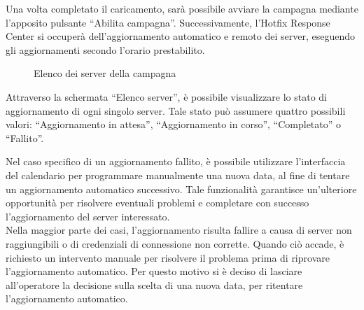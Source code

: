 Una volta completato il caricamento, sarà possibile avviare la campagna mediante 
l'apposito pulsante “Abilita campagna”. Successivamente, l'Hotfix Response Center 
si occuperà dell'aggiornamento automatico e remoto dei server, eseguendo gli 
aggiornamenti secondo l'orario prestabilito.

\begin{figure}[H]
\begin{flushright}
    \centering
    \caption{Elenco dei server della campagna}
    \label{fig:Elenco dei server della campagna}
\end{flushright}
\end{figure}

Attraverso la schermata “Elenco server”, è possibile visualizzare lo stato di 
aggiornamento di ogni singolo server. Tale stato può assumere quattro possibili 
valori: “Aggiornamento in attesa”, “Aggiornamento in corso”, “Completato” o “Fallito”.

Nel caso specifico di un aggiornamento fallito, è possibile utilizzare 
l'interfaccia del calendario per programmare manualmente una nuova data, al fine 
di tentare un aggiornamento automatico successivo. Tale funzionalità garantisce 
un'ulteriore opportunità per risolvere eventuali problemi e completare con 
successo l'aggiornamento del server interessato.\\

Nella maggior parte dei casi, l'aggiornamento risulta fallire a causa di server 
non raggiungibili o di credenziali di connessione non corrette. Quando ciò accade, 
è richiesto un intervento manuale per risolvere il problema prima di riprovare 
l'aggiornamento automatico. Per questo motivo si è deciso di lasciare all’operatore 
la decisione sulla scelta di una nuova data, per ritentare l'aggiornamento automatico.



